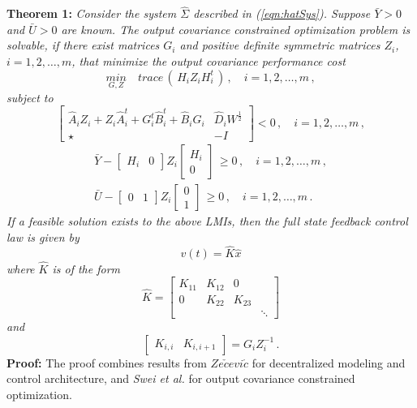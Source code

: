 \documentclass[11pt]{ucthesis}
\begin{document}
\noindent
\textbf{Theorem 1:} \textit{Consider the system $\hat{\Sigma}$ described in (\ref{eqn:hatSys}). Suppose $\bar{Y}>0$ and $\bar{U}>0$ are known. The output covariance constrained optimization problem is solvable, if there exist matrices $G_i$ and positive definite symmetric matrices $Z_i$, $i=1,2,\dots,m$, that minimize the output covariance performance cost}
\begin{equation}    \label{eqn:LMImin}
\underset{G,Z}{min}\quad trace\,(\,H_i Z_i H_{i}^{t}\,)\,,\quad i = 1,2,\dots, m\,,
\end{equation}
\textit{subject to}
\begin{equation}
\begin{bmatrix}
\hat{A}_i Z_i+Z_i \hat{A}_{i}^{t}+G_i^t \hat{B}_{i}^t+\hat{B}_i G_i &\hat{D}_i W^{\frac{1}{2}}\\\star&-I
\end{bmatrix}<0\,, \quad i = 1,2,\dots, m \,,
\label{eqn:LMILap}
\end{equation}
\begin{equation}
\begin{matrix}
\bar{Y}- \left [ \begin{array}{cc} H_i & 0 \end{array} \right ] Z_i \left [ \begin{array}{c} H_i \\ 0 \end{array} \right ] \,\geq 0 \,, \quad i = 1,2,\dots, m \,, \\
\bar{U}- \left [ \begin{array}{cc} 0 & 1 \end{array} \right ]Z_i \left [ \begin{array}{c} 0 \\ 1 \end{array} \right ] \,\geq 0 \,, \quad i = 1,2,\dots, m \,.
\end{matrix}
\label{eqn:LMIConst}
\end{equation}
\textit{If a feasible solution exists to the above LMIs, then the full state feedback control law is given by} 
\begin{equation}
v(t) = \hat{K} \hat{x}
\end{equation}
\textit{where $\hat{K}$ is of the form}
\begin{equation}
\hat{K} = \begin{bmatrix}
K_{11}&K_{12}&0\\0&K_{22}&K_{23}\\&&&\ddots
\end{bmatrix}
\label{eqn:Khat}
\end{equation}
\textit{and}
\begin{equation}
\begin{bmatrix}
K_{i,i}&K_{i,i+1}
\end{bmatrix}=G_i Z_i^{-1} \,.
\end{equation}
\noindent
{\bf Proof:} The proof combines results from $Ze\check{c}evi\acute{c}$\cite{zevcevic2005new} for decentralized modeling and control architecture, and {\it Swei et al.} \cite{swei2015lmi} for output covariance constrained optimization.
\end{document}
